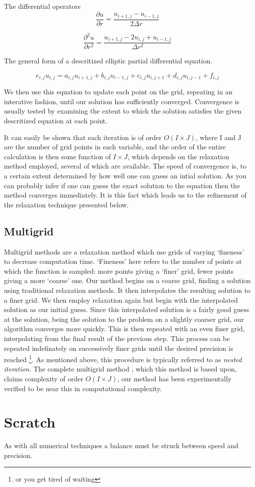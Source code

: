 \documentclass{article}
\begin{document}
The differential operators
\begin{equation}
\frac{\partial u}{\partial r} = \frac{u_{i+1, j} - u_{i-1, j}}{2\Delta r}
\end{equation}

\begin{equation}
\frac{\partial^{2} u}{\partial r^{2}} =
\frac{u_{i+1,j} - 2 u_{i,j} +u_{i-1,j}}{\Delta r^{2}}
\end{equation}

The general form of a descritized elliptic partial differential equation.

\begin{equation}
 e_{i,j} u_{i, j} = a_{i,j} u_{i+1, j} + b_{i,j} u_{i-1, j} +
 c_{i,j} u_{i, j+1} + d_{i,j} u_{i, j-1} +f_{i,j}
\end{equation}

We then use this equation to update each point on the grid, repeating in an
interative fashion, until our solution has sufficiently converged. Convergence
is usually tested by examining the extent to which the solution satisfies the
given descritized equation at each point.

It can easily be shown that each iteration is of
order $O(I\times J)$, where I and J are the number of grid points in each
variable, and the order of the entire calculation is then some function
of $I\times J$, which depends on the relaxation method employed, several
of which are available. The speed of convergence is, to a certain extent determined by how well one
 can guess an intial solution. As you can probably infer if one can guess the
 exact solution to the equation then the method converges immediately. It is
 this fact which leads us to the refinement of the relaxation technique
 presented below.

\subsection{Multigrid}
Multigrid methods are a relaxation method which use grids of varying
`fineness' to decrease computation time. `Fineness' here refers to the number
of points at which the function is sampled: more points giving a `finer' grid,
fewer points giving a more `coarse' one.
Our method begins on a coarse grid, finding a solution using traditional
relaxation methods. It then interpolates the resulting solution
to a finer grid. We then employ relaxation again but begin with the interpolated
solution as our initial guess. Since this interpolated solution is a fairly good
guess at the solution, being the solution to the problem on a slightly coarser
grid, our algorithm converges more quickly. This is then repeated with an even
finer grid, interpolating
from the final result of the previous step. This process can be repeated
indefinately on successively finer grids until the desired precision is reached
\footnote{or you get tired of waiting}. As mentioned above, this procedure is
typically referred to as \emph{nested iteration}. The complete multigrid method
, which this method is based upon, claims complexity of order $O(I\times J)$,
our method has been experimentally verified to be near this in computational
complexity.

\section{Scratch}
 As with all numerical
techniques a balance must be struck between speed and precision.
\end{document}

